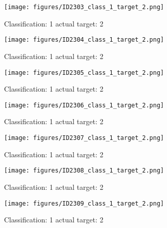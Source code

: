 \begin{figure}[h!]
\begin{center}
\texttt{[image: figures/ID2303\_class\_1\_target\_2.png]}
\end{center}
\caption{ Classification: 1 actual target: 2}
\label{fig:ID2303_class_1_target_2}
\end{figure}
\begin{figure}[h!]
\begin{center}
\texttt{[image: figures/ID2304\_class\_1\_target\_2.png]}
\end{center}
\caption{ Classification: 1 actual target: 2}
\label{fig:ID2304_class_1_target_2}
\end{figure}
\begin{figure}[h!]
\begin{center}
\texttt{[image: figures/ID2305\_class\_1\_target\_2.png]}
\end{center}
\caption{ Classification: 1 actual target: 2}
\label{fig:ID2305_class_1_target_2}
\end{figure}
\begin{figure}[h!]
\begin{center}
\texttt{[image: figures/ID2306\_class\_1\_target\_2.png]}
\end{center}
\caption{ Classification: 1 actual target: 2}
\label{fig:ID2306_class_1_target_2}
\end{figure}
\begin{figure}[h!]
\begin{center}
\texttt{[image: figures/ID2307\_class\_1\_target\_2.png]}
\end{center}
\caption{ Classification: 1 actual target: 2}
\label{fig:ID2307_class_1_target_2}
\end{figure}
\begin{figure}[h!]
\begin{center}
\texttt{[image: figures/ID2308\_class\_1\_target\_2.png]}
\end{center}
\caption{ Classification: 1 actual target: 2}
\label{fig:ID2308_class_1_target_2}
\end{figure}
\begin{figure}[h!]
\begin{center}
\texttt{[image: figures/ID2309\_class\_1\_target\_2.png]}
\end{center}
\caption{ Classification: 1 actual target: 2}
\label{fig:ID2309_class_1_target_2}
\end{figure}
